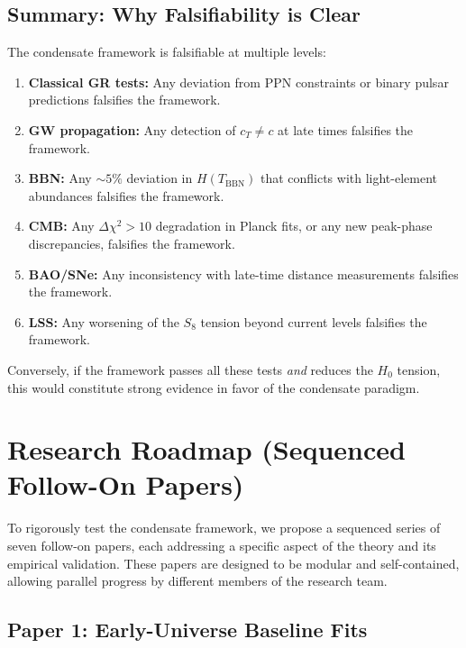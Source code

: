 \documentclass[11pt,a4paper]{article}
\theoremstyle{definition}
\begin{document}
\subsection{Summary: Why Falsifiability is Clear}
\label{sec:falsifiability_summary}

The condensate framework is falsifiable at multiple levels:
\begin{enumerate}[leftmargin=2.2em]
  \item \textbf{Classical GR tests:} Any deviation from PPN constraints or binary pulsar predictions falsifies the framework.
  \item \textbf{GW propagation:} Any detection of $c_T \neq c$ at late times falsifies the framework.
  \item \textbf{BBN:} Any $\sim 5\%$ deviation in $H(T_{\mathrm{BBN}})$ that conflicts with light-element abundances falsifies the framework.
  \item \textbf{CMB:} Any $\Delta\chi^2 > 10$ degradation in Planck fits, or any new peak-phase discrepancies, falsifies the framework.
  \item \textbf{BAO/SNe:} Any inconsistency with late-time distance measurements falsifies the framework.
  \item \textbf{LSS:} Any worsening of the $S_8$ tension beyond current levels falsifies the framework.
\end{enumerate}

Conversely, if the framework passes all these tests \emph{and} reduces the $H_0$ tension, this would constitute strong evidence in favor of the condensate paradigm.

\section{Research Roadmap (Sequenced Follow-On Papers)}
\label{sec:roadmap}

To rigorously test the condensate framework, we propose a sequenced series of seven follow-on papers, each addressing a specific aspect of the theory and its empirical validation. These papers are designed to be modular and self-contained, allowing parallel progress by different members of the research team.

\subsection{Paper 1: Early-Universe Baseline Fits}
\label{sec:paper1}
\end{document}
